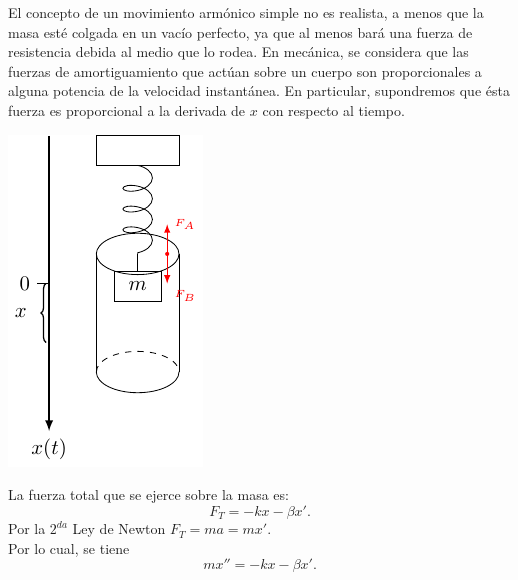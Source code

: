 \documentclass{beamer}
\begin{document}
\frame{\titlepage}

\begin{frame}[t]
	\begin{block}{}
		El concepto de un movimiento armónico simple no es realista, a menos que la masa esté colgada en un vacío perfecto, ya que al menos bará una fuerza de resistencia debida al medio que lo rodea.
		En mecánica, se considera que las fuerzas de amortiguamiento que actúan sobre un cuerpo son proporcionales a alguna potencia de la velocidad instantánea.
		En particular, supondremos que ésta fuerza es proporcional a la derivada de \(x\) con respecto al tiempo.
		\begin{minipage}{0.4\linewidth}
			\includegraphics[width= 0.6 \linewidth]{IMAGENES/1/tikz.pdf}
		\end{minipage}\hspace{5mm}
		\begin{minipage}{0.5\linewidth}
			La fuerza total que se ejerce sobre la masa es:
			\[
				F_T = -kx- \beta x'.
			\]
			Por la \(2^{da}\) Ley de Newton \(F_T=ma=mx'\). \\[2mm]
			Por lo cual, se tiene
			\[
				mx'' = -kx - \beta x'.
			\]
		\end{minipage}
	\end{block}
\end{frame}
\end{document}
